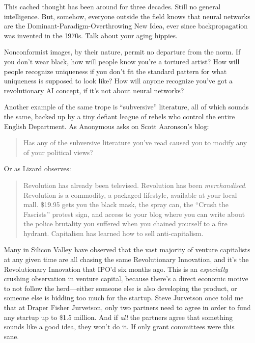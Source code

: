 {
 This cached thought has been around for three decades. Still no
general intelligence. But, somehow, everyone outside the field knows
that neural networks are the Dominant-Paradigm-Overthrowing New Idea,
ever since backpropagation was invented in the 1970s. Talk about your
aging hippies.}

{
 Nonconformist images, by their nature, permit no departure from
the norm. If you don't wear black, how will people know
you're a tortured artist? How will people recognize
uniqueness if you don't fit the standard pattern for
what uniqueness is supposed to look like? How will anyone recognize
you've got a revolutionary AI concept, if
it's not about neural networks?}

{
 Another example of the same trope is
``subversive'' literature, all of
which sounds the same, backed up by a tiny defiant league of rebels who
control the entire English Department. As Anonymous asks on Scott
Aaronson's blog:}

\begin{quote}
{
 Has any of the subversive literature you've read
 caused you to modify any of your political views?}
\end{quote}

{
 Or as Lizard observes:}

\begin{quote}
{
 Revolution has already been televised. Revolution has been
\textit{merchandised}. Revolution is a commodity, a packaged lifestyle,
available at your local mall. \$19.95 gets you the black mask, the
spray can, the ``Crush the
Fascists'' protest sign, and access to your blog
where you can write about the police brutality you suffered when you
chained yourself to a fire hydrant. Capitalism has learned how to sell
anti-capitalism.}
\end{quote}

{
 Many in Silicon Valley have observed that the vast majority of
venture capitalists at any given time are all chasing the same
Revolutionary Innovation, and it's the Revolutionary
Innovation that IPO'd six months ago. This is an
\textit{especially} crushing observation in venture capital, because
there's a direct economic motive to not follow the
herd---either someone else is also developing the product, or someone
else is bidding too much for the startup. Steve Jurvetson once told me
that at Draper Fisher Jurvetson, only two partners need to agree in
order to fund any startup up to \$1.5 million. And if \textit{all} the
partners agree that something sounds like a good idea, they
won't do it. If only grant committees were this sane.}

